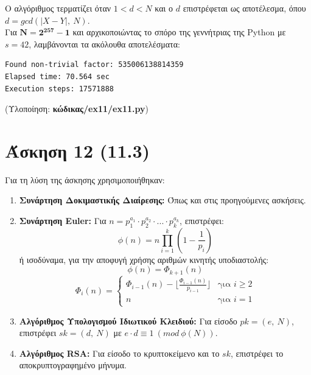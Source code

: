 \documentclass[12pt]{article}
\newcommand{\lt}{\latintext}
\begin{document}
\noindent
Ο αλγόριθμος τερματίζει όταν $1 < d < N$ και ο $d$ επιστρέφεται ως αποτέλεσμα, 
όπου \\ 
$d = gcd(\vert X - Y \vert,\:N)$. \\

\noindent
Για $\mathbf{N = 2^{257} - 1}$ και αρχικοποιώντας το σπόρο της γεννήτριας της {\lt Python} με $s = 42$, λαμβάνονται τα ακόλουθα αποτελέσματα:

{ \lt
\begin{verbatim}
Found non-trivial factor: 535006138814359
Elapsed time: 70.564 sec
Execution steps: 17571888
\end{verbatim}
}

\vspace{0.1in}
\noindent
(Υλοποίηση: \textbf{κώδικας/{\lt ex11/ex11.py}})

\pagebreak

\section*{Άσκηση 12 (11.3)}

Για τη λύση της άσκησης χρησιμοποιήθηκαν:
\begin{enumerate}
	\item \textbf{Συνάρτηση Δοκιμαστικής Διαίρεσης:} Όπως και στις προηγούμενες ασκήσεις.
	\item \textbf{Συνάρτηση {\lt Euler}:} Για $n = p_1^{a_1} \cdot p_2^{a_2} \cdot ... \cdot p_k^{a_k}$, επιστρέφει:
	\[
		\phi(n) = n \prod_{i=1}^{k}\left(1 - \frac{1}{p_i}\right)
	\]
	ή ισοδύναμα, για την αποφυγή χρήσης αριθμών κινητής υποδιαστολής:
	\[
		\phi(n) = \Phi_{k+1}(n)
	\]
	\[
		\Phi_{i}(n) = 
		\left\{
		\begin{array}{ll}
			\Phi_{i-1}(n) - \lfloor \frac{\Phi_{i-1}(n)}{p_{i-1}} \rfloor 
			& \text{για } i \geq 2 \\
			n & \text{για } i = 1
		\end{array}
		\right.
	\]
	\item \textbf{Αλγόριθμος Υπολογισμού Ιδιωτικού Κλειδιού:} Για είσοδο $pk = (e,\:N)$, επιστρέφει $sk = (d,\:N)$ με $e \cdot d \equiv 1\:(mod\:\phi(N))$.
	\item \textbf{Αλγόριθμος {\lt RSA}:} Για είσοδο το κρυπτοκείμενο και το $sk$, επιστρέφει το αποκρυπτογραφημένο μήνυμα.
\end{enumerate}

\hfill
\end{document}
